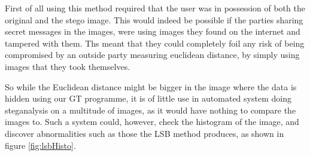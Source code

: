 First of all using this method required that the user was in possession of both the original and the stego image.
This would indeed be possible if the parties sharing secret messages in the images, were using images they found on the internet and tampered with them.
Ths meant that they could completely foil any risk of being compromised by an outside party measuring euclidean distance, by simply using images that they took themselves.

So while the Euclidean distance might be bigger in the image where the data is hidden using our GT programme, it is of little use in automated system doing steganalysis on a multitude of images, as it would have nothing to compare the images to. 
Such a system could, however, check the histogram of the image, and discover abnormalities such as those the LSB method produces, as shown in figure \ref{fig:lsbHisto}.
